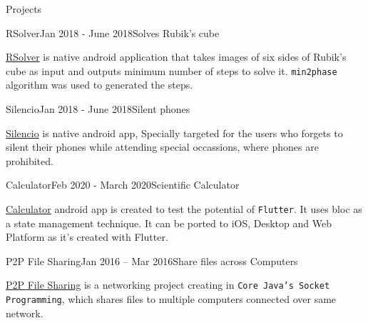 \documentclass{resume} %
\begin{document}
\begin{rSection}{Projects}
\begin{rSubsection}{RSolver}{Jan 2018 - June 2018}{Solves Rubik's cube}

\item \href{https://bitbucket.org/Jaydangar/rsolverapp/src/master/}{RSolver} is native android application that takes images of six sides of Rubik’s cube as input and outputs minimum number of steps to solve it. \texttt{min2phase} algorithm was used to generated the steps.
\end{rSubsection} 

\begin{rSubsection}{Silencio}{Jan 2018 - June 2018}{Silent phones}

\item \href{https://bitbucket.org/Jaydangar/silencioapp/src}{Silencio} is native android app, Specially targeted for the users who forgets to silent their phones while attending special occassions, where phones are prohibited.
\end{rSubsection} 

\begin{rSubsection}{Calculator}{Feb 2020 - March 2020}{Scientific Calculator}

\item \href{https://github.com/jaydangar/ScientificCalculator}{Calculator} android app is created to test the potential of \texttt{Flutter}. It uses bloc as a state management technique.
It can be ported to iOS, Desktop and Web Platform as it's created with Flutter.
\end{rSubsection} 

\begin{rSubsection}{P2P File Sharing}{Jan 2016 – Mar 2016}{Share files across Computers}

\item \href{https://github.com/jaydangar/Peer-to-Peer-File-Share}{P2P File Sharing} is a networking project creating in \texttt{Core Java's Socket Programming}, which shares files to multiple computers connected over same network.
\end{rSubsection} 
\end{rSection}
\end{document}
